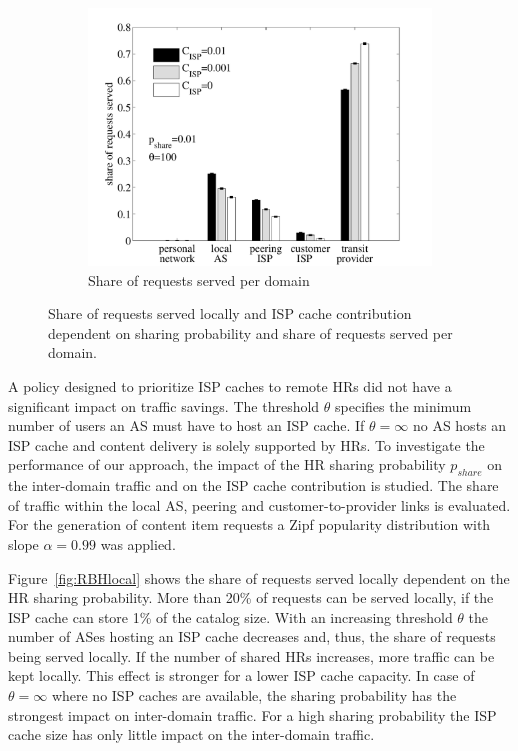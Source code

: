 \begin{figure}[ht!]
\begin{subfigure}[t]{0.32\textwidth}
\includegraphics[width=\textwidth]{hierarchical/simulative/figures/RBHall}
\caption{Share of requests served per domain}
\label{fig:RBHall}
\end{subfigure}
\caption{Share of requests served locally and ISP cache contribution dependent on sharing probability and share of requests served per domain.}
\end{figure}

A policy designed to prioritize ISP caches to remote HRs did not have a significant impact on traffic savings.
The threshold $\theta$ specifies the minimum number of users an AS must have to host an ISP cache. If $\theta=\infty$ no AS hosts an ISP cache and content delivery is solely supported by HRs.
To investigate the performance of our approach, the impact of the HR sharing probability $p_{share}$ on the inter-domain traffic and on the ISP cache contribution is studied. The share of traffic within the local AS, peering and customer-to-provider links is evaluated.
For the generation of content item requests a Zipf popularity distribution with slope $\alpha=0.99$ was applied.


Figure~\ref{fig:RBHlocal} shows the share of requests served locally dependent on the HR sharing probability. More than 20\% of requests can be served locally, if the ISP cache can store 1\% of the catalog size. With an increasing threshold $\theta$ the number of ASes hosting an ISP cache decreases and, thus, the share of requests being served locally. If the number of shared HRs increases, more traffic can be kept locally. This effect is stronger for a lower ISP cache capacity. In case of $\theta=\infty$ where no ISP caches are available, the sharing probability has the strongest impact on inter-domain traffic. For a high sharing probability the ISP cache size has only little impact on the inter-domain traffic.

